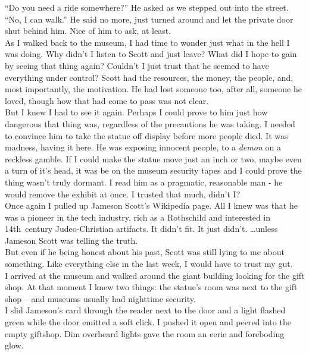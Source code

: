\documentclass[a5paper]{scrartcl}
\begin{document}
\enquote{Do you need a ride somewhere?} He asked as we stepped out into the street.\\


\enquote{No, I can walk.} He said no more, just turned around and let the private door shut behind him.  Nice of him to ask, at least.\\


As I walked back to the museum, I had time to wonder just what in the hell I was doing. Why didn't I listen to Scott and just leave? What did I hope to gain by seeing that thing again? Couldn't I just trust that he seemed to have everything under control? Scott had the resources, the money, the people, and, most importantly, the motivation. He had lost someone too, after all, someone he loved, though how that had come to pass was not clear. \\


But I knew I had to see it again. Perhaps I could prove to him just how dangerous that thing was, regardless of the precautions he was taking. I needed to convince him to take the statue off display before more people died. It was madness, having it here. He was exposing innocent people, to a \textit{demon}
 on a reckless gamble. If I could make the statue move just an inch or two, maybe even a turn of it's head, it was be on the museum security tapes and I could prove the thing wasn't truly dormant. I read him as a pragmatic, reasonable man - he would remove the exhibit at once. I trusted that much, didn't I? \\


Once again I pulled up Jameson Scott's Wikipedia page. All I knew was that he was  a pioneer in the tech industry, rich as a Rothschild and interested in 14th~century Judeo-Christian artifacts. It didn't fit. It just didn't. \dots unless Jameson Scott was telling the truth.\\


But even if he being honest about his past, Scott was still lying to me about something. Like everything else in the last week, I would have to trust my gut.\\


I arrived at the museum and walked around the giant building looking for the gift shop. At that moment I knew two things: the statue's room was next to the gift shop -- and museums usually had nighttime security.\\


I slid Jameson's card through the reader next to the door and a light flashed green while the door emitted a soft click. I pushed it open and peered into the empty giftshop. Dim overheard lights gave the room an eerie and foreboding glow. \\
\end{document}
